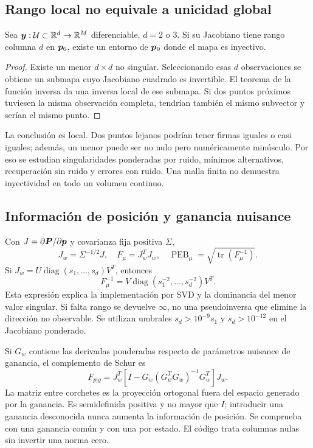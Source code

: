 \subsection{Rango local no equivale a unicidad global}
\begin{proposicion}
Sea $\bm{y}:\mathcal U\subset\mathbb R^d\to\mathbb R^M$ diferenciable, $d=2$ o 3. Si su Jacobiano tiene rango columna $d$ en $\bm{p}_0$, existe un entorno de $\bm{p}_0$ donde el mapa es inyectivo.
\end{proposicion}
\begin{proof}
Existe un menor $d\times d$ no singular. Seleccionando esas $d$ observaciones se obtiene un submapa cuyo Jacobiano cuadrado es invertible. El teorema de la función inversa da una inversa local de ese submapa. Si dos puntos próximos tuviesen la misma observación completa, tendrían también el mismo subvector y serían el mismo punto.
\end{proof}

La conclusión es local. Dos puntos lejanos podrían tener firmas iguales o casi iguales; además, un menor puede ser no nulo pero numéricamente minúsculo. Por eso se estudian singularidades ponderadas por ruido, mínimos alternativos, recuperación sin ruido y errores con ruido. Una malla finita no demuestra inyectividad en todo un volumen continuo.

\subsection{Información de posición y ganancia nuisance}
Con $J=\partial\bm{P}/\partial\bm{p}$ y covarianza fija positiva $\Sigma$,
\begin{equation}
J_w=\Sigma^{-1/2}J,\quad F_\mu=J_w^T J_w,\quad
\operatorname{PEB}_\mu=\sqrt{\operatorname{tr}(F_\mu^{-1})}.
\end{equation}
Si $J_w=U\operatorname{diag}(s_1,\ldots,s_d)V^T$, entonces
\begin{equation}
F_\mu^{-1}=V\operatorname{diag}(s_1^{-2},\ldots,s_d^{-2})V^T.
\end{equation}
Esta expresión explica la implementación por SVD y la dominancia del menor valor singular. Si falta rango se devuelve $\infty$, no una pseudoinversa que elimine la dirección no observable. Se utilizan umbrales $s_d>10^{-9}s_1$ y $s_d>10^{-12}$ en el Jacobiano ponderado.

Si $G_w$ contiene las derivadas ponderadas respecto de parámetros nuisance de ganancia, el complemento de Schur es
\begin{equation}
F_{p|g}=J_w^T\left[I-G_w(G_w^TG_w)^{-1}G_w^T\right]J_w.
\end{equation}
La matriz entre corchetes es la proyección ortogonal fuera del espacio generado por la ganancia. Es semidefinida positiva y no mayor que $I$; introducir una ganancia desconocida nunca aumenta la información de posición. Se comprueba con una ganancia común y con una por estado. El código trata columnas nulas sin invertir una norma cero.

